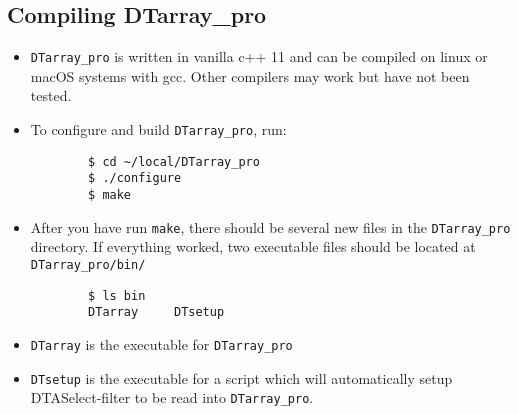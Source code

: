 \documentclass[12pt]{article}
\begin{document}
	\subsection{Compiling DTarray\_pro}

	\begin{itemize}

	\item \texttt{DTarray\_pro} is written in vanilla c++ 11 and can be compiled on linux or macOS systems with gcc. Other compilers may work but have not been tested.

	\item To configure and build \texttt{DTarray\_pro}, run:

	\begin{lstlisting}
		$ cd ~/local/DTarray_pro
		$ ./configure
		$ make
	\end{lstlisting}

	\item After you have run \texttt{make}, there should be several new files in the \texttt{DTarray\_pro} directory.  If everything worked, two executable files should be located at \texttt{DTarray\_pro/bin/}
		
	\begin{lstlisting}
		$ ls bin
		DTarray		DTsetup
	\end{lstlisting}
		
	\item \texttt{DTarray} is the executable for \texttt{DTarray\_pro}
		
	\item \texttt{DTsetup} is the executable for a script which will automatically setup DTASelect-filter to be read into \texttt{DTarray\_pro}.

	\end{itemize}



	
	
\end{document}
